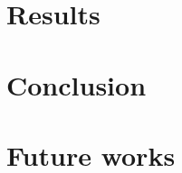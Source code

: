 \documentclass[a4paper, 10pt]{article}
\begin{document}

\section{Results}
\label{sec:results}




\section{Conclusion}
\label{sec:conclusion}



\section{Future works}
\label{sec:future}






\end{document}
